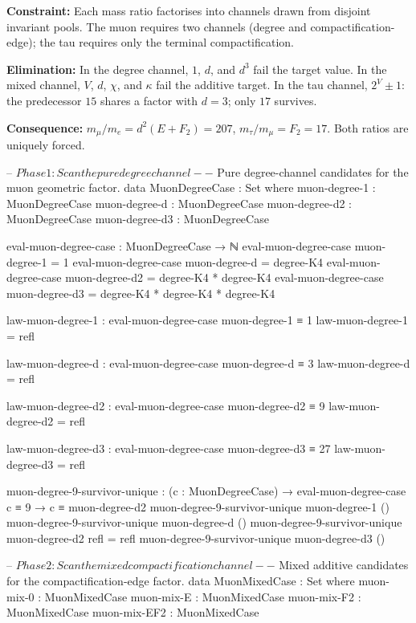 \documentclass[11pt,a4paper]{book}
\begin{document}
\textbf{Constraint:}
Each mass ratio factorises into channels drawn from disjoint
invariant pools.  The muon requires two channels (degree and
compactification-edge); the tau requires only the terminal
compactification.

\textbf{Elimination:}
In the degree channel, $1$, $d$, and $d^3$ fail the target value.
In the mixed channel, $V$, $d$, $\chi$, and $\kappa$ fail the
additive target.  In the tau channel, $2^V \pm 1$: the predecessor
$15$ shares a factor with $d = 3$; only $17$ survives.

\textbf{Consequence:}
$m_\mu / m_e = d^2 (E + F_2) = 207$, \;$m_\tau / m_\mu = F_2 = 17$.
Both ratios are uniquely forced.

\begin{code}
-- $ Phase 1: Scan the pure degree channel

-- $ Pure degree-channel candidates for the muon geometric factor.
data MuonDegreeCase : Set where
  muon-degree-1  : MuonDegreeCase
  muon-degree-d  : MuonDegreeCase
  muon-degree-d2 : MuonDegreeCase
  muon-degree-d3 : MuonDegreeCase

eval-muon-degree-case : MuonDegreeCase → ℕ
eval-muon-degree-case muon-degree-1  = 1
eval-muon-degree-case muon-degree-d  = degree-K4
eval-muon-degree-case muon-degree-d2 = degree-K4 * degree-K4
eval-muon-degree-case muon-degree-d3 = degree-K4 * degree-K4 * degree-K4

law-muon-degree-1 : eval-muon-degree-case muon-degree-1 ≡ 1
law-muon-degree-1 = refl

law-muon-degree-d : eval-muon-degree-case muon-degree-d ≡ 3
law-muon-degree-d = refl

law-muon-degree-d2 : eval-muon-degree-case muon-degree-d2 ≡ 9
law-muon-degree-d2 = refl

law-muon-degree-d3 : eval-muon-degree-case muon-degree-d3 ≡ 27
law-muon-degree-d3 = refl

muon-degree-9-survivor-unique :
  (c : MuonDegreeCase) →
  eval-muon-degree-case c ≡ 9 →
  c ≡ muon-degree-d2
muon-degree-9-survivor-unique muon-degree-1 ()
muon-degree-9-survivor-unique muon-degree-d ()
muon-degree-9-survivor-unique muon-degree-d2 refl = refl
muon-degree-9-survivor-unique muon-degree-d3 ()

-- $ Phase 2: Scan the mixed compactification channel

-- $ Mixed additive candidates for the compactification-edge factor.
data MuonMixedCase : Set where
  muon-mix-0    : MuonMixedCase
  muon-mix-E    : MuonMixedCase
  muon-mix-F2   : MuonMixedCase
  muon-mix-EF2  : MuonMixedCase


\end{code}
\end{document}
